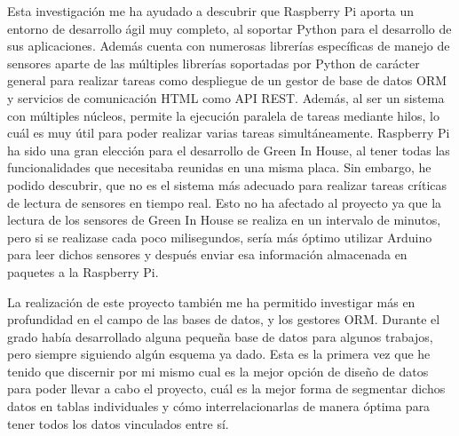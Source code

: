 Esta investigación me ha ayudado a descubrir que Raspberry Pi aporta un entorno de desarrollo ágil muy completo, al soportar Python para el desarrollo de sus aplicaciones. Además cuenta con numerosas librerías específicas de manejo de sensores aparte de las múltiples librerías soportadas por Python de carácter general para realizar tareas como despliegue de un gestor de base de datos ORM y servicios de comunicación HTML como API REST. Además, al ser un sistema con múltiples núcleos, permite la ejecución paralela de tareas mediante hilos, lo cuál es muy útil para poder realizar varias tareas simultáneamente. Raspberry Pi ha sido una gran elección para el desarrollo de Green In House, al tener todas las funcionalidades que necesitaba reunidas en una misma placa. Sin embargo, he podido descubrir, que no es el sistema más adecuado para realizar tareas críticas de lectura de sensores en tiempo real. Esto no ha afectado al proyecto ya que la lectura de los sensores de Green In House se realiza en un intervalo de minutos, pero si se realizase cada poco milisegundos, sería más óptimo utilizar Arduino para leer dichos sensores y después enviar esa información almacenada en paquetes a la Raspberry Pi.

La realización de este proyecto también me ha permitido investigar más en profundidad en el campo de las bases de datos, y los gestores ORM. Durante el grado había desarrollado alguna pequeña base de datos para algunos trabajos, pero siempre siguiendo algún esquema ya dado. Esta es la primera vez que he tenido que discernir por mi mismo cual es la mejor opción de diseño de datos para poder llevar a cabo el proyecto, cuál es la mejor forma de segmentar dichos datos en tablas individuales y cómo interrelacionarlas de manera óptima para tener todos los datos vinculados entre sí.


